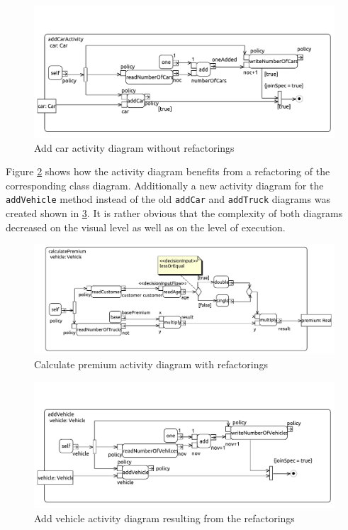 \documentclass{llncs}
\begin{document}
\begin{figure}[ht]
 \centering
 \includegraphics[scale=0.6]{images/insurance/Activity_addCarActivity_addCarActivity}
 \caption{Add car activity diagram without refactorings}
 \label{fig:addCar}
\end{figure}

Figure \ref{fig:calculatePremiumRef} shows how the activity diagram benefits from a refactoring of the corresponding 
class diagram. Additionally a new activity diagram for the \lstinline|addVehicle| method instead of the old 
\lstinline|addCar| and \lstinline|addTruck| diagrams was created shown in \ref{fig:addCarRef}. It is rather obvious 
that the complexity of both diagrams decreased on the visual level as well as on the level of execution.

\begin{figure}[h!t]
 \centering
 \includegraphics[scale=0.5]{images/insurance_ref/Activity_calculatePremium_calculatePremium}
 \caption{Calculate premium activity diagram with refactorings}
 \label{fig:calculatePremiumRef}
\end{figure}

\begin{figure}[ht]
 \centering
 \includegraphics[scale=0.6]{images/insurance_ref/Activity_addVehicle_addVehicle}
 \caption{Add vehicle activity diagram resulting from the refactorings}
 \label{fig:addCarRef}
\end{figure}
\end{document}
